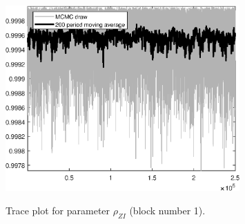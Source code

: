 \begin{figure}[H]
\centering
  \includegraphics[width=0.8\textwidth]{BRS_comovement/graphs/TracePlot_rho_ZI_blck_1}\\
    \caption{Trace plot for parameter ${\rho_{ZI}}$ (block number 1).}
\end{figure}
